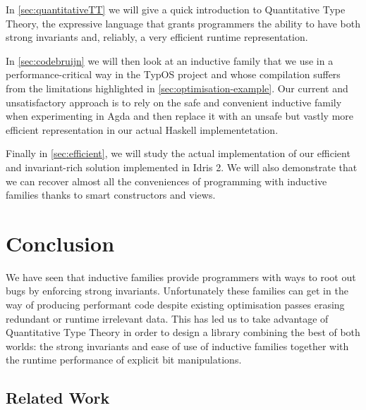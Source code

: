 \documentclass{article}
\newcommand{\typos}{TypOS}
\newcommand{\idris}{Idris 2}
\begin{document}
In \cref{sec:quantitativeTT} we will give a quick introduction to Quantitative
Type Theory, the expressive language that grants programmers the ability
to have both strong invariants and, reliably, a very efficient runtime
representation.

In \cref{sec:codebruijn} we will then look at an inductive family that we
use in a performance-critical way in the \typos{}
project and whose compilation suffers from the limitations highlighted in
\cref{sec:optimisation-example}.
%
Our current and unsatisfactory approach is to rely on the safe and convenient
inductive family when experimenting in Agda and then replace it with an unsafe
but vastly more efficient representation in our actual Haskell implementetation.

Finally in \cref{sec:efficient}, we will study the actual implementation of
our efficient and invariant-rich solution implemented in \idris{}. We will
also demonstrate that we can recover almost all the conveniences of programming
with inductive families thanks to smart constructors and views.








\section{Conclusion}\label{sec:conclusion}

We have seen that inductive families provide programmers with ways to root out bugs
by enforcing strong invariants. Unfortunately these families can get in the way of
producing performant code despite existing optimisation passes erasing redundant
or runtime irrelevant data.
%
This has led us to take advantage of Quantitative Type Theory in order to design a library
combining the best of both worlds: the strong invariants and ease of use of inductive
families together with the runtime performance of explicit bit manipulations.

\subsection{Related Work}
\end{document}
